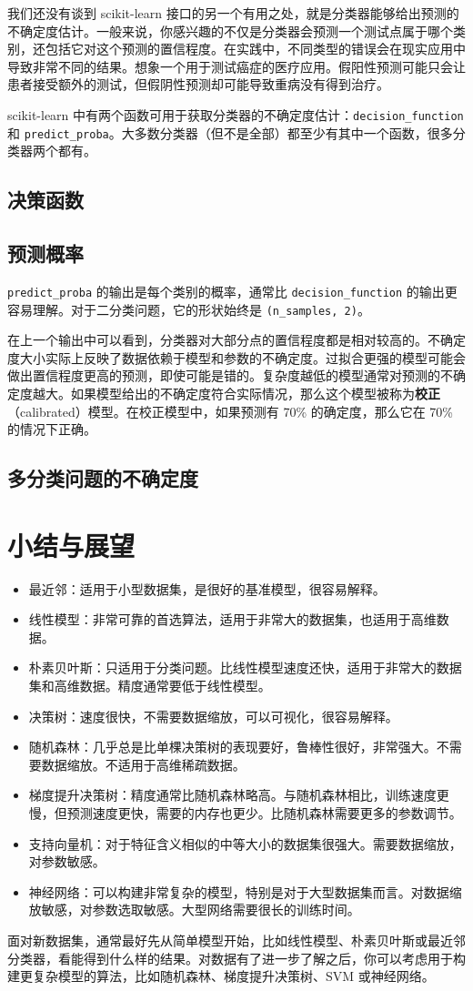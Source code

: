 我们还没有谈到 scikit-learn 接口的另一个有用之处，就是分类器能够给出预测的不确定度估计。一般来说，你感兴趣的不仅是分类器会预测一个测试点属于哪个类别，还包括它对这个预测的置信程度。在实践中，不同类型的错误会在现实应用中导致非常不同的结果。想象一个用于测试癌症的医疗应用。假阳性预测可能只会让患者接受额外的测试，但假阴性预测却可能导致重病没有得到治疗。

scikit-learn 中有两个函数可用于获取分类器的不确定度估计：\verb|decision_function| 和 \verb|predict_proba|。大多数分类器（但不是全部）都至少有其中一个函数，很多分类器两个都有。
\subsection{决策函数}
\subsection{预测概率}
\verb|predict_proba| 的输出是每个类别的概率，通常比 \verb|decision_function| 的输出更容易理解。对于二分类问题，它的形状始终是 \verb|(n_samples, 2)|。

在上一个输出中可以看到，分类器对大部分点的置信程度都是相对较高的。不确定度大小实际上反映了数据依赖于模型和参数的不确定度。过拟合更强的模型可能会做出置信程度更高的预测，即使可能是错的。复杂度越低的模型通常对预测的不确定度越大。如果模型给出的不确定度符合实际情况，那么这个模型被称为\textbf{校正}（calibrated）模型。在校正模型中，如果预测有 70\% 的确定度，那么它在 70\% 的情况下正确。

\subsection{多分类问题的不确定度}

\section{小结与展望}
\begin{itemize}
    \item 最近邻：适用于小型数据集，是很好的基准模型，很容易解释。
    \item 线性模型：非常可靠的首选算法，适用于非常大的数据集，也适用于高维数据。
    \item 朴素贝叶斯：只适用于分类问题。比线性模型速度还快，适用于非常大的数据集和高维数据。精度通常要低于线性模型。
    \item 决策树：速度很快，不需要数据缩放，可以可视化，很容易解释。
    \item 随机森林：几乎总是比单棵决策树的表现要好，鲁棒性很好，非常强大。不需要数据缩放。不适用于高维稀疏数据。
    \item 梯度提升决策树：精度通常比随机森林略高。与随机森林相比，训练速度更慢，但预测速度更快，需要的内存也更少。比随机森林需要更多的参数调节。
    \item 支持向量机：对于特征含义相似的中等大小的数据集很强大。需要数据缩放，对参数敏感。
    \item 神经网络：可以构建非常复杂的模型，特别是对于大型数据集而言。对数据缩放敏感，对参数选取敏感。大型网络需要很长的训练时间。
\end{itemize}

面对新数据集，通常最好先从简单模型开始，比如线性模型、朴素贝叶斯或最近邻分类器，看能得到什么样的结果。对数据有了进一步了解之后，你可以考虑用于构建更复杂模型的算法，比如随机森林、梯度提升决策树、SVM 或神经网络。